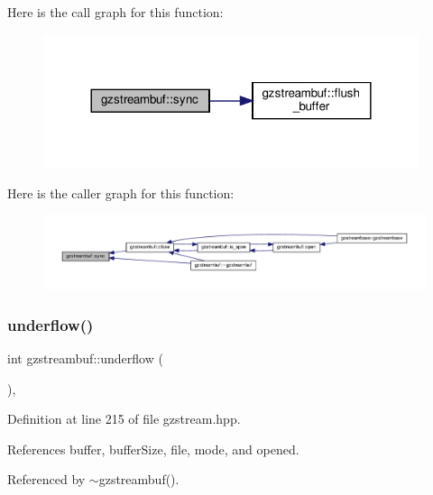 Here is the call graph for this function\+:
\nopagebreak
\begin{figure}[H]
\begin{center}
\leavevmode
\includegraphics[width=312pt]{d7/de3/classgzstreambuf_afec93b74f334978be8a0e9bd0ec6eee6_cgraph}
\end{center}
\end{figure}
Here is the caller graph for this function\+:
\nopagebreak
\begin{figure}[H]
\begin{center}
\leavevmode
\includegraphics[width=350pt]{d7/de3/classgzstreambuf_afec93b74f334978be8a0e9bd0ec6eee6_icgraph}
\end{center}
\end{figure}
\mbox{\label{classgzstreambuf_a83b34ca4fc77dcebfb5152bbbb6b5652}} 
\subsubsection{\texorpdfstring{underflow()}{underflow()}}
{\footnotesize\ttfamily int gzstreambuf\+::underflow (\begin{DoxyParamCaption}{ }\end{DoxyParamCaption})\hspace{0.3cm}{\ttfamily [inline]}, {\ttfamily [override]}}



Definition at line 215 of file gzstream.\+hpp.



References buffer, buffer\+Size, file, mode, and opened.



Referenced by $\sim$gzstreambuf().

